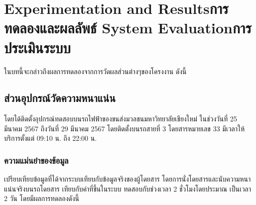 \chapter{\ifproject%
\ifenglish Experimentation and Results\else การทดลองและผลลัพธ์\fi
\else%
\ifenglish System Evaluation\else การประเมินระบบ\fi
\fi}

ในบทนี้จะกล่าวถึงผลการทดลองจากการวัดผลส่วนต่างๆของโครงงาน ดังนี้

\section{ส่วนอุปกรณ์วัดความหนาแน่น}

โดยได้ติดตั้งอุปกรณ์ทดสอบบนรถไฟฟ้าของขนส่งมวลชนมหาวิทยาลัยเชียงใหม่ ในช่วงวันที่ 25 มีนาคม 2567 ถึงวันที่ 29 มีนาคม 2567 โดยติดตั้งบนรถสายที่ 3 โดยสารหมายเลข 33 มีเวลาให้บริการตั้งแต่ 09:10 น. ถึง 22:00 น.

\subsection{ความแม่นยำของข้อมูล}

เปรียบเทียบข้อมูลที่ได้จากระบบเทียบกับข้อมูลจริงของผู้โดยสาร โดยการนั่งโดยสารและนับความหนาแน่นจริงบนรถโดยสาร เทียบกับค่าที่ขึ้นในระบบ ทดสอบกับช่วงเวลา 2 ชั่วโมงโดยประมาณ เป็นเวลา 2 วัน โดยมีผลการทดลองดังนี้

